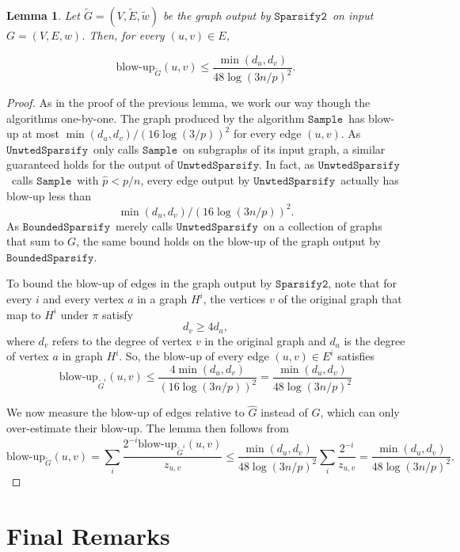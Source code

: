 \documentclass[11pt]{article}
\newtheorem{lemma}[theorem]{Lemma}
\newcommand{\sparsifytwo}{\ensuremath{\mathtt{Sparsify2}}}
\newcommand{\unwtedsparsify}{\ensuremath{\mathtt{UnwtedSparsify}}}
\newcommand{\boundedsparsify}{\ensuremath{\mathtt{BoundedSparsify}}}
\newcommand{\sample}{\ensuremath{\mathtt{Sample}}}
\def\Gtil{\widetilde{G}}
\def\Etil{\widetilde{E}}
\def\Ghat{\widehat{G}}
\def\wtil{\tilde{w}}
\def\phat{\hat{p}}
\def\blowup#1#2{\textrm{blow-up}_{#1}\left( #2 \right)}
\begin{document}
\begin{lemma}\label{lem:maxBlowUp}
Let $\Gtil = (V, \Etil , \wtil )$
  be the graph output by \sparsifytwo \ on input $G = (V,E,w)$.
Then, for every $(u,v) \in E$,
\end{lemma}
\vspace{-0.2in}
\begin{equation}\label{eqn:maxblowup}
  \blowup{\Gtil }{u,v} \leq
  \frac{\min (d_{u}, d_{v})}{48 \log (3 n /p)^{2}}.
\end{equation}

\begin{proof}
As in the proof of the previous lemma, we work our way though the algorithms
  one-by-one.
The graph produced by the  algorithm \sample \
  has blow-up at most $\min (d_{u}, d_{v}) / (16 \log (3/p))^{2}$
  for every edge $(u,v)$.
As \unwtedsparsify \ only calls \sample \ on subgraphs of its input graph,
  a similar guaranteed holds for the output of \unwtedsparsify.
In fact, as \unwtedsparsify \ calls \sample \ with $\phat < p/n$,
  every edge output by \unwtedsparsify \ actually has blow-up less than
\[
\min (d_{u}, d_{v}) / (16 \log (3 n /p))^{2}.
\]
As \boundedsparsify \ merely calls \unwtedsparsify \ on a collection of
  graphs that sum to $G$, the same bound holds on the blow-up of the
  graph output by \boundedsparsify  .

To bound the blow-up of edges in the graph output by \sparsifytwo  ,
  note that for every $i$ and every vertex $a$ in a graph $H^{i}$,
  the vertices $v$ of the original graph that map to $H^{i}$ under
  $\pi$ satisfy
\[
  d_{v} \geq 4 d_{a},
\]
where $d_{v}$ refers to the degree of vertex $v$ in the original graph
  and $d_{a}$ is the degree of vertex $a$ in graph $H^{i}$.
So, the blow-up of every edge $(u,v) \in E^{i}$ satisfies
\[
\blowup{\Gtil^{i}}{u,v} \leq
\frac{4 \min (d_{u}, d_{v})}{ (16 \log (3 n /p))^{2}}
=
\frac{\min (d_{u}, d_{v})}{ 48 \log (3 n /p)^{2}}
\]

We now measure the blow-up of edges relative to $\Ghat$ instead of
  $G$, which can only over-estimate their blow-up.
The lemma then follows from
\[
  \blowup{\Gtil}{u,v}
=
  \sum_{i} \frac{2^{-i} \blowup{\Gtil^{i}}{u,v}}{z_{u,v}}
\leq
\frac{\min (d_{u}, d_{v})}{ 48 \log (3 n /p)^{2}}
  \sum_{i} \frac{2^{-i}}{z_{u,v}}
=
\frac{\min (d_{u}, d_{v})}{ 48 \log (3 n /p)^{2}}.
\]

\end{proof}

\section{Final Remarks}\label{sec:conclusion}
\end{document}
